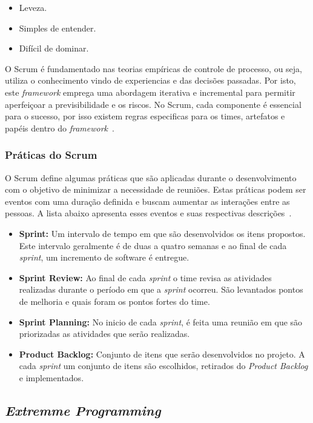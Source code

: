 \begin{itemize}
    \item Leveza.
    \item Simples de entender.
    \item Difícil de dominar.
\end{itemize}

O Scrum é fundamentado nas teorias empíricas de controle de processo, ou seja, utiliza o conhecimento vindo de experiencias e das decisões passadas. Por isto, este  \textit{framework} emprega uma abordagem iterativa e incremental para permitir aperfeiçoar a previsibilidade e os riscos. No Scrum, cada componente é essencial para o sucesso, por isso existem regras especificas para os times, artefatos e papéis dentro do \textit{framework}~\cite{scrum}.

\subsubsection{Práticas do Scrum}
\label{est:sof:met:pra}

O Scrum define algumas práticas que são aplicadas durante o desenvolvimento com o objetivo de minimizar a necessidade de reuniões. Estas práticas podem ser eventos com uma duração definida e buscam aumentar as interações entre as pessoas. A lista abaixo apresenta esses eventos e suas respectivas descrições~\cite{scrum}.

\begin{itemize}
    \item \textbf{Sprint:} Um intervalo de tempo em que são desenvolvidos os itens propostos. Este intervalo geralmente é de duas a quatro semanas e ao final de cada \textit{sprint}, um incremento de software é entregue.
    \item \textbf{Sprint Review:} Ao final de cada \textit{sprint} o time revisa as atividades realizadas durante o período em que a \textit{sprint} ocorreu. São levantados pontos de melhoria e quais foram os pontos fortes do time.
    \item \textbf{Sprint Planning:} No inicio de cada \textit{sprint}, é feita uma reunião em que são priorizadas as atividades que serão realizadas.
    \item \textbf{Product Backlog:} Conjunto de itens que serão desenvolvidos no projeto. A cada \textit{sprint} um conjunto de itens são escolhidos, retirados do \textit{Product Backlog} e implementados.
\end{itemize}

\subsection{\textit{Extremme Programming}}

